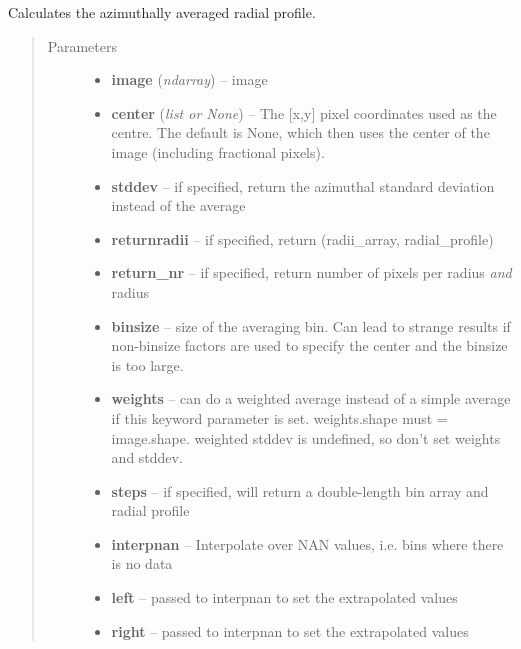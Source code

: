 \documentclass[a4paper,11pt,english]{sphinxmanual}
\begin{document}
\begin{fulllineitems}
\label{analysis:analysis.CTIpower.azimuthalAverage}
Calculates the azimuthally averaged radial profile.
\begin{quote}\begin{description}
\item[{Parameters}] \leavevmode\begin{itemize}
\item {} 
\textbf{image} (\emph{ndarray}) -- image

\item {} 
\textbf{center} (\emph{list or None}) -- The {[}x,y{]} pixel coordinates used as the centre. The default is
None, which then uses the center of the image (including fractional pixels).

\item {} 
\textbf{stddev} -- if specified, return the azimuthal standard deviation instead of the average

\item {} 
\textbf{returnradii} -- if specified, return (radii\_array, radial\_profile)

\item {} 
\textbf{return\_nr} -- if specified, return number of pixels per radius \emph{and} radius

\item {} 
\textbf{binsize} -- size of the averaging bin.  Can lead to strange results if
non-binsize factors are used to specify the center and the binsize is too large.

\item {} 
\textbf{weights} -- can do a weighted average instead of a simple average if this keyword parameter
is set.  weights.shape must = image.shape.  weighted stddev is undefined, so don't
set weights and stddev.

\item {} 
\textbf{steps} -- if specified, will return a double-length bin array and radial profile

\item {} 
\textbf{interpnan} -- Interpolate over NAN values, i.e. bins where there is no data

\item {} 
\textbf{left} -- passed to interpnan to set the extrapolated values

\item {} 
\textbf{right} -- passed to interpnan to set the extrapolated values

\end{itemize}

\end{description}\end{quote}

\end{fulllineitems}
\end{document}
